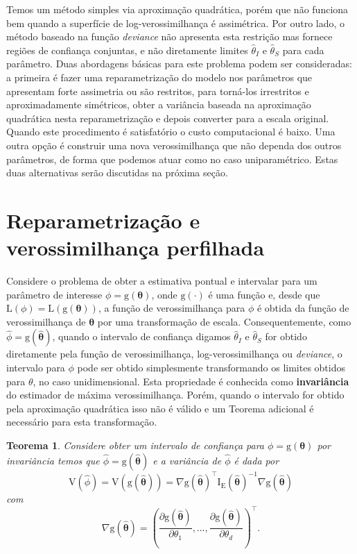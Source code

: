 \documentclass[
  9pt,
  a5paper,
]{book}
\newtheorem{theorem}{Teorema}[chapter]
\theoremstyle{definition}
\theoremstyle{definition}
\theoremstyle{definition}
\theoremstyle{definition}
\theoremstyle{remark}
\begin{document}
Temos um método simples via aproximação quadrática, porém que não funciona bem quando a superfície de log-verossimilhança é assimétrica. Por outro lado, o método baseado na função \emph{deviance} não apresenta esta restrição mas fornece regiões de confiança conjuntas, e não diretamente limites \(\hat{\theta}_I\) e \(\hat{\theta}_S\) para cada parâmetro.
Duas abordagens básicas para este problema podem ser consideradas: a primeira é fazer uma reparametrização do modelo nos parâmetros que apresentam forte assimetria ou são restritos, para torná-los irrestritos e aproximadamente simétricos, obter a variância baseada na aproximação quadrática nesta reparametrização e depois converter para a escala original. Quando este procedimento é satisfatório o custo computacional é baixo. Uma outra opção é construir uma nova verossimilhança que não dependa dos outros parâmetros, de forma que podemos atuar como no caso uniparamétrico. Estas duas alternativas serão discutidas na próxima seção.

\hypertarget{reparametrizauxe7uxe3o-e-verossimilhanuxe7a-perfilhada}{%
\section{Reparametrização e verossimilhança perfilhada}\label{reparametrizauxe7uxe3o-e-verossimilhanuxe7a-perfilhada}}

Considere o problema de obter a estimativa pontual e intervalar para um parâmetro de interesse \(\phi = \mathrm{g}(\boldsymbol{\theta})\), onde \(\mathrm{g}(\cdot)\) é uma função e, desde que \(\mathrm{L}(\phi) = \mathrm{L}( \mathrm{g}(\boldsymbol{\theta}))\), a função de verossimilhança para \(\phi\) é obtida da função de verossimilhança de \(\boldsymbol{\theta}\) por uma transformação de escala. Consequentemente, como \(\hat{\phi} = \mathrm{g}(\boldsymbol{\hat{\theta}})\), quando o intervalo de confiança digamos \(\hat{\theta}_I\) e \(\hat{\theta}_S\) for obtido diretamente pela função de verossimilhança, log-verossimilhança ou \emph{deviance}, o intervalo para \(\phi\) pode ser obtido simplesmente transformando os limites obtidos para \(\theta\), no caso unidimensional. Esta propriedade é conhecida como \textbf{invariância} do estimador de máxima verossimilhança. Porém, quando o intervalo for obtido pela aproximação quadrática isso não é válido e um Teorema adicional é necessário para esta transformação.

\begin{theorem}
\protect\hypertarget{thm:delta}{}\label{thm:delta}Considere obter um intervalo de confiança para \(\phi = \mathrm{g}(\boldsymbol{\theta})\) por invariância temos que \(\hat{\phi} = \mathrm{g}(\hat{\boldsymbol{\theta}})\) e a variância de \(\hat{\phi}\) é dada por
\[ \mathrm{V}(\hat{\phi}) = \mathrm{V}( \mathrm{g}(\hat{\boldsymbol{\theta}})) = \nabla \mathrm{g}(\hat{\boldsymbol{\theta}})^\top \mathrm{I_E}(\hat{\boldsymbol{\theta}})^{-1}  \nabla \mathrm{g}(\hat{\boldsymbol{\theta}}) \]
com
\[ \nabla \mathrm{g}(\hat{\boldsymbol{\theta}}) = \left( \frac{\partial \mathrm{g}(\hat{\boldsymbol{\theta}})}{\partial \theta_1}, \ldots, \frac{\partial \mathrm{g}(\hat{\boldsymbol{\theta}})}{\partial \theta_d} \right)^\top. \]
\end{theorem}
\end{document}
